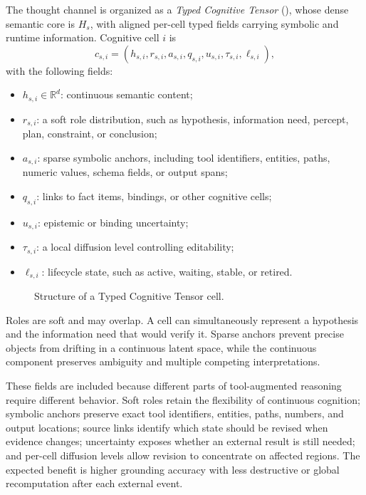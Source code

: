 The thought channel is organized as a \emph{Typed Cognitive Tensor} (\tct), whose dense semantic core is $H_s$, with aligned per-cell typed fields carrying symbolic and runtime information. Cognitive cell $i$ is
\begin{equation}
  c_{s,i} = (h_{s,i}, r_{s,i}, a_{s,i}, q_{s,i}, u_{s,i}, \tau_{s,i}, \ell_{s,i}),
  \label{eq:cognitive-cell}
\end{equation}
with the following fields:
\begin{itemize}[leftmargin=*]
  \item $h_{s,i}\in\mathbb{R}^d$: continuous semantic content;
  \item $r_{s,i}$: a soft role distribution, such as hypothesis, information need, percept, plan, constraint, or conclusion;
  \item $a_{s,i}$: sparse symbolic anchors, including tool identifiers, entities, paths, numeric values, schema fields, or output spans;
  \item $q_{s,i}$: links to fact items, bindings, or other cognitive cells;
  \item $u_{s,i}$: epistemic or binding uncertainty;
  \item $\tau_{s,i}$: a local diffusion level controlling editability;
  \item $\ell_{s,i}$: lifecycle state, such as active, waiting, stable, or retired.
\end{itemize}

\begin{figure}[htbp]
  \centering
  
  \caption{Structure of a Typed Cognitive Tensor cell.}
  \label{fig:tct-anatomy}
\end{figure}

Roles are soft and may overlap. A cell can simultaneously represent a hypothesis and the information need that would verify it. Sparse anchors prevent precise objects from drifting in a continuous latent space, while the continuous component preserves ambiguity and multiple competing interpretations.

These fields are included because different parts of tool-augmented reasoning require different behavior. Soft roles retain the flexibility of continuous cognition; symbolic anchors preserve exact tool identifiers, entities, paths, numbers, and output locations; source links identify which state should be revised when evidence changes; uncertainty exposes whether an external result is still needed; and per-cell diffusion levels allow revision to concentrate on affected regions. The expected benefit is higher grounding accuracy with less destructive or global recomputation after each external event.


